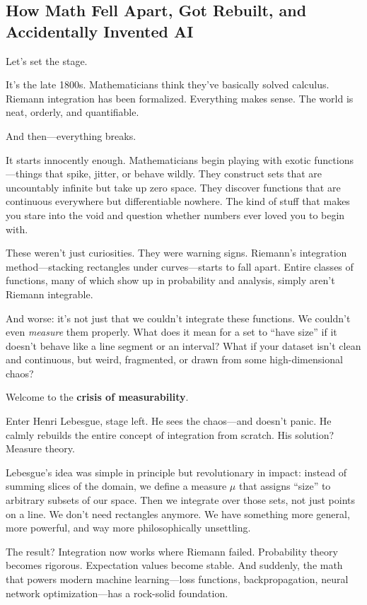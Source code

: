 \subsection{How Math Fell Apart, Got Rebuilt, and Accidentally Invented AI}

Let’s set the stage.

It’s the late 1800s. Mathematicians think they’ve basically solved calculus. Riemann integration has been formalized. Everything makes sense. The world is neat, orderly, and quantifiable.

And then—everything breaks.

It starts innocently enough. Mathematicians begin playing with exotic functions—things that spike, jitter, or behave wildly. They construct sets that are uncountably infinite but take up zero space. They discover functions that are continuous everywhere but differentiable nowhere. The kind of stuff that makes you stare into the void and question whether numbers ever loved you to begin with.

These weren’t just curiosities. They were warning signs. Riemann’s integration method—stacking rectangles under curves—starts to fall apart. Entire classes of functions, many of which show up in probability and analysis, simply aren’t Riemann integrable. 

And worse: it’s not just that we couldn’t integrate these functions. We couldn’t even \textit{measure} them properly. What does it mean for a set to “have size” if it doesn’t behave like a line segment or an interval? What if your dataset isn’t clean and continuous, but weird, fragmented, or drawn from some high-dimensional chaos?

Welcome to the \textbf{crisis of measurability}.

Enter Henri Lebesgue, stage left. He sees the chaos—and doesn’t panic. He calmly rebuilds the entire concept of integration from scratch. His solution? Measure theory.

Lebesgue’s idea was simple in principle but revolutionary in impact: instead of summing slices of the domain, we define a measure \( \mu \) that assigns “size” to arbitrary subsets of our space. Then we integrate over those sets, not just points on a line. We don’t need rectangles anymore. We have something more general, more powerful, and way more philosophically unsettling.

The result? Integration now works where Riemann failed. Probability theory becomes rigorous. Expectation values become stable. And suddenly, the math that powers modern machine learning—loss functions, backpropagation, neural network optimization—has a rock-solid foundation.

